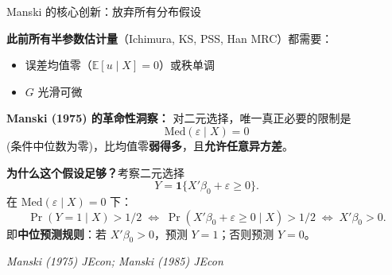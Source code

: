 \documentclass[aspectratio=169, 10pt]{beamer}
\begin{document}
\begin{frame}[shrink=10]{Manski 的核心创新：放弃所有分布假设}

  \textbf{此前所有半参数估计量}（Ichimura, KS, PSS, Han MRC）都需要：
  \begin{itemize}\setlength{\itemsep}{1pt}
    \item 误差均值零（$\mathbb{E}[u\mid X] = 0$）或秩单调
    \item $G$ 光滑可微
  \end{itemize}

  \begin{keybox}
    \textbf{Manski (1975) 的革命性洞察：}
    对二元选择，唯一真正必要的限制是
    $$\boxed{\;\text{Med}(\varepsilon \mid X) = 0\;}$$
    (条件中位数为零)，比均值零\textbf{弱得多}，且\textbf{允许任意异方差}。
  \end{keybox}

  \begin{highlightbox}
    \textbf{为什么这个假设足够？}考察二元选择
    $$Y = \mathbf{1}\{X'\beta_0 + \varepsilon \geq 0\}.$$
    在 $\text{Med}(\varepsilon \mid X) = 0$ 下：
    $$\Pr(Y = 1\mid X) > 1/2 \;\Leftrightarrow\; \Pr(X'\beta_0 + \varepsilon \geq 0\mid X) > 1/2
    \;\Leftrightarrow\; X'\beta_0 > 0.$$
    即\textbf{中位预测规则}：若 $X'\beta_0 > 0$，预测 $Y = 1$；否则预测 $Y = 0$。
  \end{highlightbox}

  \hfill{\scriptsize\textit{Manski (1975) JEcon; Manski (1985) JEcon}}

\end{frame}
\end{document}
